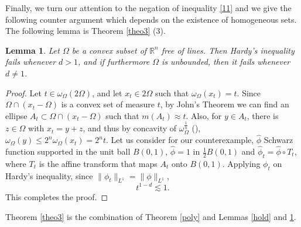 \documentclass[footinclude=true]{amsart}
\theoremstyle{plain}
\newtheorem{lm}[theo]{Lemma}
\begin{document}
	Finally, we turn our attention to the negation of inequality \eqref{11} and we give the following counter argument which depends on the existence of homogeneous sets. The following lemma is Theorem \ref{theo3} (3).
\begin{lm}\label{John}
	Let $\Omega$ be a convex subset of $\mathbb{R}^{n}$ free of lines. Then Hardy's inequality fails whenever $d>1$, and if furthermore $\Omega$ is unbounded, then it fails whenever $d\neq1$.
\end{lm}
\begin{proof}
	Let $t\in\omega_{\Omega}(2\Omega)$, and let $x_t\in2\Omega$ such that $\omega_{\Omega}(x_t)=t$. Since $\Omega\cap (x_t-\Omega)$ is a convex set of measure $t$, by John's Theorem \cite{John1948} we can find an ellipse $A_t\subset \Omega\cap (x_t-\Omega)$ such that $m(A_t)\approx t$. Also, for $y\in A_t$, there is $z\in \Omega$ with $x_t=y+z$, and thus by concavity of $\omega_{\Omega}^{\frac{1}{n}}$ (\cite[Lemma 2.1]{bampouras2024besovspacesschattenclass}), $\omega_{\Omega}(y)\leq 2^{n}\omega_{\Omega}(x_t) =2^{n}t$. Let us consider for our counterexample, $\widehat{\phi}$ Schwarz function supported in the unit ball $B(0,1)$, $\widehat{\phi}=1$ in $\frac{1}{2} B(0,1)$ and $\widehat{\phi}_t=\widehat{\phi}\circ T_t$, where $T_t$ is the affine transform that maps $A_t$ onto $B(0,1)$. Applying $\phi_t$ on Hardy's inequality, since $\|\phi_t\|_{L^1}= \|\phi\|_{L^1}$,
	$$t^{1-d}\lesssim 1.$$
	This completes the proof.
\end{proof}
Theorem \ref{theo3} is the combination of Theorem \ref{poly} and Lemmas \ref{hold} and \ref{John}.

	
	
	
	
\end{document}
